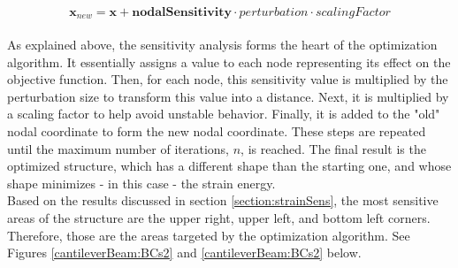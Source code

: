 \begin{equation} \label{eqn:nodalAdjustment}
    \textbf{x}_{new} = \textbf{x} + \textbf{nodalSensitivity} \cdot perturbation \cdot scalingFactor 
\end{equation}\\
As explained above, the sensitivity analysis forms the heart of the optimization algorithm. It essentially assigns a value to each node representing its effect on the objective function. Then, for each node, this sensitivity value is multiplied by the perturbation size to transform this value into a distance. Next, it is multiplied by a scaling factor to help avoid unstable behavior. Finally, it is added to the "old" nodal coordinate to form the new nodal coordinate. These steps are repeated until the maximum number of iterations, $n$, is reached. The final result is the optimized structure, which has a different shape than the starting one, and whose shape minimizes - in this case - the strain energy. \\[6pt]
Based on the results discussed in section \ref{section:strainSens}, the most sensitive areas of the structure are the upper right, upper left, and bottom left corners. Therefore, those are the areas targeted by the optimization algorithm. See Figures \ref{cantileverBeam:BCs2} and \ref{cantileverBeam:BCs2} below.\\
